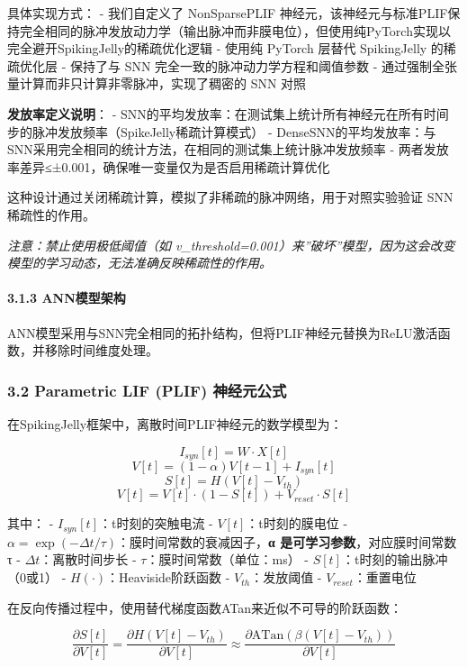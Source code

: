 \documentclass[
]{article}
\begin{document}
具体实现方式： - 我们自定义了 NonSparsePLIF
神经元，该神经元与标准PLIF保持完全相同的脉冲发放动力学（输出脉冲而非膜电位），但使用纯PyTorch实现以完全避开SpikingJelly的稀疏优化逻辑
- 使用纯 PyTorch 层替代 SpikingJelly 的稀疏优化层 - 保持了与 SNN
完全一致的脉冲动力学方程和阈值参数 -
通过强制全张量计算而非只计算非零脉冲，实现了稠密的 SNN 对照

\textbf{发放率定义说明}： -
SNN的平均发放率：在测试集上统计所有神经元在所有时间步的脉冲发放频率（SpikeJelly稀疏计算模式）
-
DenseSNN的平均发放率：与SNN采用完全相同的统计方法，在相同的测试集上统计脉冲发放频率
- 两者发放率差异≤±0.001，确保唯一变量仅为是否启用稀疏计算优化

这种设计通过关闭稀疏计算，模拟了非稀疏的脉冲网络，用于对照实验验证 SNN
稀疏性的作用。

\emph{注意：禁止使用极低阈值（如
v\_threshold=0.001）来''破坏''模型，因为这会改变模型的学习动态，无法准确反映稀疏性的作用。}

\paragraph{3.1.3 ANN模型架构}\label{annux6a21ux578bux67b6ux6784}

ANN模型采用与SNN完全相同的拓扑结构，但将PLIF神经元替换为ReLU激活函数，并移除时间维度处理。

\subsubsection{3.2 Parametric LIF (PLIF)
神经元公式}\label{parametric-lif-plif-ux795eux7ecfux5143ux516cux5f0f}

在SpikingJelly框架中，离散时间PLIF神经元的数学模型为：

\[ I_{syn}[t] = W \cdot X[t] \]
\[ V[t] = (1-\alpha)V[t-1] + I_{syn}[t] \] \[ S[t] = H(V[t] - V_{th}) \]
\[ V[t] = V[t] \cdot (1-S[t]) + V_{reset} \cdot S[t] \]

其中： - \(I_{syn}[t]\)：t时刻的突触电流 - \(V[t]\)：t时刻的膜电位 -
\(\alpha = \exp(-\Delta t/\tau)\)：膜时间常数的衰减因子，\textbf{α
是可学习参数}，对应膜时间常数 τ - \(\Delta t\)：离散时间步长 -
\(\tau\)：膜时间常数（单位：ms） - \(S[t]\)：t时刻的输出脉冲（0或1） -
\(H(\cdot)\)：Heaviside阶跃函数 - \(V_{th}\)：发放阈值 -
\(V_{reset}\)：重置电位

在反向传播过程中，使用替代梯度函数ATan来近似不可导的阶跃函数：

\[ \frac{\partial S[t]}{\partial V[t]} = \frac{\partial H(V[t] - V_{th})}{\partial V[t]} \approx \frac{\partial \text{ATan}(\beta(V[t] - V_{th}))}{\partial V[t]} \]
\end{document}
